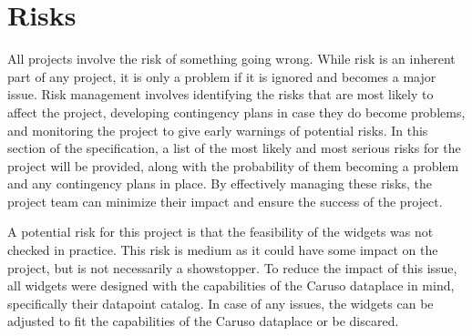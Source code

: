 \chapter{Risks}

All projects involve the risk of something going wrong. While risk is an inherent part of any project, it is only a problem if it is ignored and becomes a major issue. Risk management involves identifying the risks that are most likely to affect the project, developing contingency plans in case they do become problems, and monitoring the project to give early warnings of potential risks. In this section of the specification, a list of the most likely and most serious risks for the project will be provided, along with the probability of them becoming a problem and any contingency plans in place. By effectively managing these risks, the project team can minimize their impact and ensure the success of the project.


A potential risk for this project is that the feasibility of the widgets was not checked in practice. This risk is medium as it could have some impact on the project, but is not necessarily a showstopper. To reduce the impact of this issue, all widgets were designed with the capabilities of the Caruso dataplace in mind, specifically their datapoint catalog. In case of any issues, the widgets can be adjusted to fit the capabilities of the Caruso dataplace or be discared.

